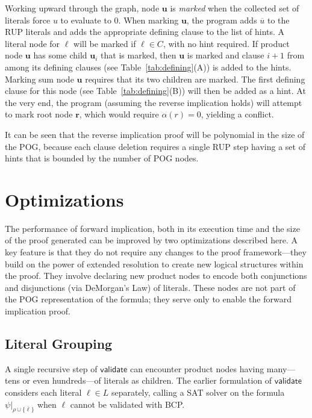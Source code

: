 \documentclass[letterpaper,USenglish,cleveref, autoref, thm-restate]{lipics-v2021}
\newcommand{\obar}[1]{\overline{#1}}
\newcommand{\lit}{\ell}
\newcommand{\assign}{\alpha}
\newcommand{\passign}{\rho}
\newcommand{\validate}{\textsf{validate}}
\newcommand{\makenode}[1]{\mathbf{#1}}
\newcommand{\nodeu}{\makenode{u}}
\newcommand{\noder}{\makenode{r}}
\newcommand{\simplify}[2]{#1|_{#2}}
\begin{document}
Working upward through the graph, node $\nodeu$ is {\em marked} when
the collected set of literals force $u$ to evaluate to $0$.  When marking $\nodeu$, the
program adds $\obar{u}$ to the RUP literals and adds the appropriate
defining clause to the list of hints.  A literal node for
$\lit$ will be marked if $\lit \in C$, with no hint required.  If
product node $\nodeu$ has some child $\nodeu_i$ that is marked, then
$\nodeu$ is marked and clause $i+1$ from among its defining clauses (see Table~\ref{tab:defining}(A)) is
added to the hints.  Marking sum node $\nodeu$ requires that its two children are marked.
The first defining
clause for this node (see Table~\ref{tab:defining}(B)) will then be added as a hint.  At the very end, the program
(assuming the reverse implication holds) will attempt to mark root
node $\noder$, which would require $\assign(r) = 0$, yielding a
conflict.

It can be seen that the reverse implication proof will be polynomial in the size of the POG\@, because
each clause deletion requires a single RUP step having a set of hints that is
bounded by the number of POG nodes.

\section{Optimizations}

The performance of forward implication, both in its execution time and
the size of the proof generated can be improved by two optimizations
described here.  A key feature is that they do not require any changes
to the proof framework---they build on the power of extended
resolution to create new logical structures within the proof.  They
involve declaring new product nodes to encode both conjunctions and
disjunctions (via DeMorgan's Law) of literals.  These nodes are not
part of the POG representation of the formula; they serve only to enable the forward implication proof.

\subsection{Literal Grouping}

A single recursive step of $\validate$ can encounter product nodes
having many---tens or even hundreds---of literals as children.  The earlier formulation of $\validate$
considers each literal $\lit \in L$ separately,
calling a SAT solver
on the formula  $\simplify{\psi}{\passign \cup \{\obar{\lit}\}}$ when $\lit$ cannot be validated with BCP\@.
\end{document}
